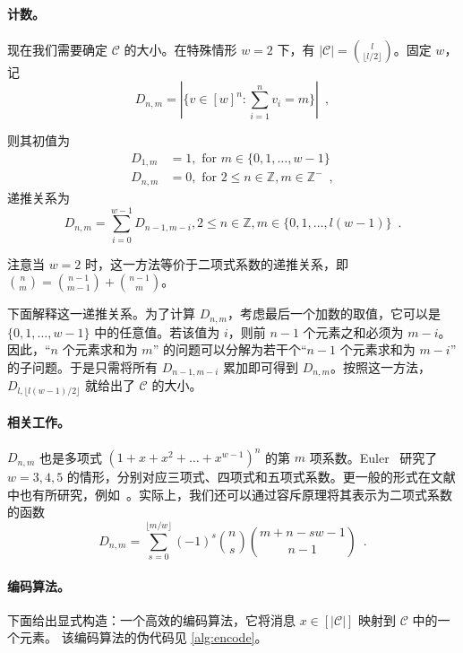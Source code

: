 \paragraph{计数。} 现在我们需要确定 $\mathcal{C}$ 的大小。在特殊情形 $w=2$ 下，有 $|\mathcal{C}|=\binom{l}{\lfloor l/2 \rfloor}$。固定 $w$，记
$$ D_{n,m}= |\{v\in [w]^n : \sum_{i=1}^{n} v_i = m \}| \enspace , $$

则其初值为
\begin{align*}
D_{1,m} &= 1 , \mbox{ for }m\in \{0,1,\dots,w-1\} \\
D_{n,m} &= 0 , \mbox{ for }2\leq n \in \mathbb{Z}, m \in \mathbb{Z^-} \enspace ,
\end{align*}
递推关系为
\begin{equation} \label{equ:recurrence}
    D_{n,m} = \sum_{i=0}^{w-1} D_{n-1,m-i} , 2 \leq n \in \mathbb{Z},m\in \{0,1,\dots,l(w-1)\} \enspace .
\end{equation}

注意当 $w=2$ 时，这一方法等价于二项式系数的递推关系，即 $\binom{n}{m}=\binom{n-1}{m-1}+\binom{n-1}{m}$。

下面解释这一递推关系。为了计算 $D_{n,m}$，考虑最后一个加数的取值，它可以是 $\{0,1,\dots,w-1\}$ 中的任意值。若该值为 $i$，则前 $n-1$ 个元素之和必须为 $m-i$。因此，“$n$ 个元素求和为 $m$” 的问题可以分解为若干个“$n-1$ 个元素求和为 $m-i$” 的子问题。于是只需将所有 $D_{n-1,m-i}$ 累加即可得到 $D_{n,m}$。按照这一方法，$D_{l,\lfloor l(w-1)/2 \rfloor}$ 就给出了 $\mathcal{C}$ 的大小。

\paragraph{相关工作。} $D_{n,m}$ 也是多项式 $(1+x+x^2+\dots+x^{w-1})^n$ 的第 $m$ 项系数。Euler~\cite{euler1801evolutione} 研究了 $w=3,4,5$ 的情形，分别对应三项式、四项式和五项式系数。更一般的形式在文献中也有所研究，例如~\cite{andre1876memoire,warnaar1997andrews,belbachir2020congruence}。实际上，我们还可以通过容斥原理将其表示为二项式系数的函数~\cite{28861}
$$ D_{n,m} = \sum_{s=0}^{\lfloor{m/w}\rfloor} (-1)^s \binom{n}{s} \binom{m+n-sw-1}{n-1} \enspace .$$

\paragraph{编码算法。} 下面给出显式构造：一个高效的编码算法，它将消息 $x\in [|\mathcal{C}|]$ 映射到 $\mathcal{C}$ 中的一个元素。
该编码算法的伪代码见 \cref{alg:encode}。
\begin{algorithm}
\caption{Encode:$[|\mathcal{C}|]\rightarrow\mathcal{C}$.} \label{alg:encode}
\end{algorithm}

